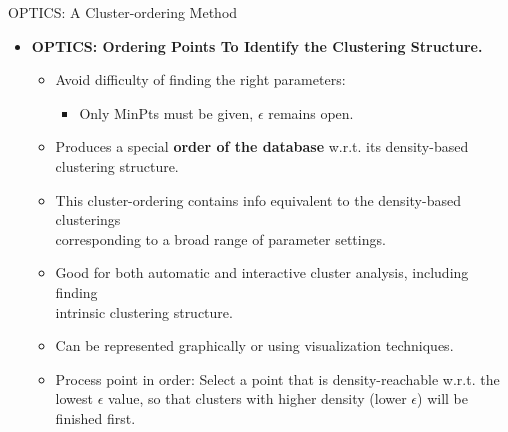 \begin{frame}{OPTICS: A Cluster-ordering Method}
	\begin{itemize}
		\item \textbf{OPTICS: Ordering Points To Identify the Clustering
			      Structure.}
		      \begin{itemize}
			      \item Avoid difficulty of finding the right parameters:
			            \begin{itemize}
				            \item Only MinPts must be given, $\epsilon$ remains open.
			            \end{itemize}
			      \item Produces a special \textbf{order of the database} w.r.t. its
			            density-based clustering structure.
			      \item This cluster-ordering contains info equivalent to the
			            density-based clusterings \\ corresponding to a broad range of
			            parameter settings.
			      \item Good for both automatic and interactive cluster analysis,
			            including finding \\
			            intrinsic clustering structure.
			      \item Can be represented graphically or using visualization
			            techniques.
			      \item Process point in order: Select a point that is
			            density-reachable w.r.t. the lowest $\epsilon$ value, so that
			            clusters with higher density (lower $\epsilon$) will be finished
			            first.
		      \end{itemize}
	\end{itemize}
\end{frame}

